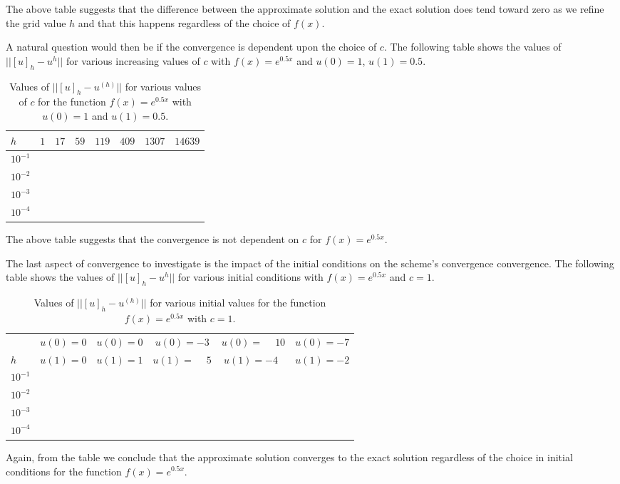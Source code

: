 The above table suggests that the difference between the approximate solution
and the exact solution does tend toward zero as we refine the grid value $h$ and
that this happens regardless of the choice of $f(x)$.

A natural question would then be if the convergence is dependent upon the choice
of $c$. The following table shows the values of $||[u]_h - u^{h}||$ for various
increasing values of $c$ with $f(x) = e^{0.5x}$ and $u(0) = 1$, $u(1) = 0.5$.

\begin{table}[h!]
  \centering
  \bgroup
  \def\arraystretch{1.5}
  \begin{tabular}{| l | c | c | c | c | c | c | c |}
    \hline
    $h$ & $1$ & $17$ & $59$ & $119$ & $409$ & $1307$ & $14639$\\
    \hline
    $10^{-1}$ & & & & & & & \\
    $10^{-2}$ & & & & & & & \\
    $10^{-3}$ & & & & & & & \\
    $10^{-4}$ & & & & & & & \\
    \hline
  \end{tabular}
  \egroup
  \caption{Values of $||[u]_h - u^{(h)}||$ for various values of $c$ for the function $f(x) = e^{0.5x}$ with $u(0) = 1$ and $u(1) = 0.5$.}
\end{table}

The above table suggests that the convergence is not dependent on $c$ for $f(x) = e^{0.5x}$.

The last aspect of convergence to investigate is the impact of the initial conditions
on the scheme's convergence convergence. The following table shows the values of $||[u]_h - u^{h}||$ for various
initial conditions with $f(x) = e^{0.5x}$ and $c=1$.

\begin{table}[h!]
  \centering
  \bgroup
  \def\arraystretch{1.5}
  \begin{tabular}{| l | c | c | c | c | c |}
    \hline
    & $u(0) = 0$ & $u(0) = 0$ & $u(0) = -3$ & $u(0) = \phantom{-}10$ & $u(0) = -7$ \\
    $h$ &  $u(1) = 0$ & $u(1) = 1$ & $u(1) = \phantom{-}5$ & $u(1) = -4\phantom{0}$ & $u(1) = -2$\\
    \hline
    $10^{-1}$ & & & & & \\
    $10^{-2}$ & & & & & \\
    $10^{-3}$ & & & & & \\
    $10^{-4}$ & & & & & \\
    \hline
  \end{tabular}
  \egroup
  \caption{Values of $||[u]_h - u^{(h)}||$ for various initial values for the function $f(x) = e^{0.5x}$ with $c=1$.}
\end{table}

Again, from the table we conclude that the approximate solution converges to the
exact solution regardless of the choice in initial conditions for the function
$f(x) = e^{0.5x}$.
